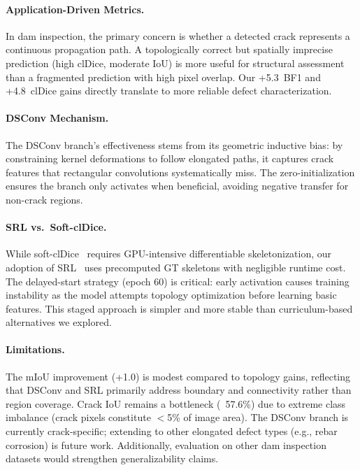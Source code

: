 \documentclass[10pt,twocolumn,letterpaper]{article}
\begin{document}
\paragraph{Application-Driven Metrics.}
In dam inspection, the primary concern is whether a detected crack represents a continuous propagation path. A topologically correct but spatially imprecise prediction (high clDice, moderate IoU) is more useful for structural assessment than a fragmented prediction with high pixel overlap. Our +5.3~BF1 and +4.8~clDice gains directly translate to more reliable defect characterization.

\paragraph{DSConv Mechanism.}
The DSConv branch's effectiveness stems from its geometric inductive bias: by constraining kernel deformations to follow elongated paths, it captures crack features that rectangular convolutions systematically miss. The zero-initialization ensures the branch only activates when beneficial, avoiding negative transfer for non-crack regions.

\paragraph{SRL vs.\ Soft-clDice.}
While soft-clDice~\cite{shit2021cldice} requires GPU-intensive differentiable skeletonization, our adoption of SRL~\cite{shit2024skeleton} uses precomputed GT skeletons with negligible runtime cost. The delayed-start strategy (epoch 60) is critical: early activation causes training instability as the model attempts topology optimization before learning basic features. This staged approach is simpler and more stable than curriculum-based alternatives we explored.

\paragraph{Limitations.}
The mIoU improvement (+1.0) is modest compared to topology gains, reflecting that DSConv and SRL primarily address boundary and connectivity rather than region coverage. Crack IoU remains a bottleneck (~57.6\%) due to extreme class imbalance (crack pixels constitute $<$5\% of image area). The DSConv branch is currently crack-specific; extending to other elongated defect types (e.g., rebar corrosion) is future work. Additionally, evaluation on other dam inspection datasets would strengthen generalizability claims.
\end{document}
